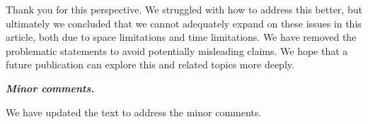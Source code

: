 \documentclass[11pt]{mhletter}
\begin{document}
Thank you for this perspective.  We struggled with how to address this better, but ultimately we concluded that we cannot adequately expand on these issues in this article, both due to space limitations and time limitations.  We have removed the problematic statements to avoid potentially misleading claims.  We hope that a future publication can explore this and related topics more deeply.


\textbf{\textit{Minor comments.}}

We have updated the text to address the minor comments.
\end{document}
